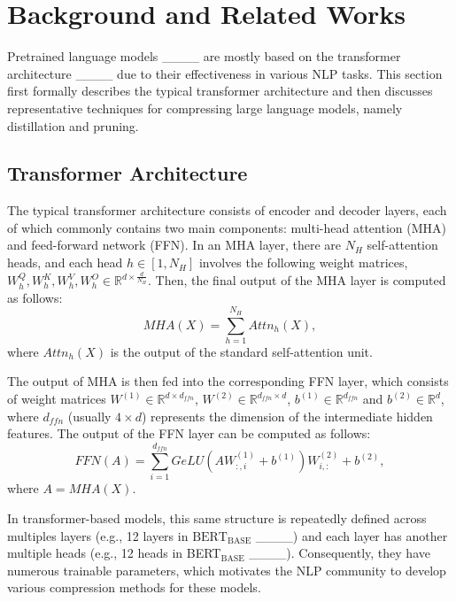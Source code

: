 \section{Background and Related Works}
\label{sec:related}
Pretrained language models ____ are mostly based on the transformer architecture ____ due to their effectiveness in various NLP tasks. This section first formally describes the typical transformer architecture and then discusses representative techniques for compressing large language models, namely distillation and pruning.


\subsection{Transformer Architecture}
The typical transformer architecture consists of encoder and decoder layers, each of which commonly contains two main components: multi-head attention (MHA) and feed-forward network (FFN). In an MHA layer, there are $N_H$ self-attention heads, and each head $h \in [1, N_H]$ involves the following weight matrices, $W_{h}^{Q}, W_{h}^{K}, W_{h}^{V}, W_{h}^{O} \in \mathbb{R}^{{d} \times\frac{d}{N_H}}$. Then, the final output of the MHA layer is computed as follows:
$$
MHA(X)= \sum_{h = 1}^{N_{H}} Attn_{h}(X),
$$
where $Attn_{h}(X)$ is the output of the standard self-attention unit.

The output of MHA is then fed into the corresponding FFN layer, which consists of weight matrices $W^{(1)}\in \mathbb{R}^{d \times d_{ffn}}$, $W^{(2)}\in \mathbb{R}^{d_{ffn} \times d}$, $b^{(1)}\in \mathbb{R}^{d_{ffn}}$ and $b^{(2)}\in \mathbb{R}^{d}$, where $d_{ffn}$ (usually $4\times d$) represents the dimension of the
intermediate hidden features. The output of the FFN layer can be computed as follows:
$$
FFN(A)=\sum_{i=1}^{d_{ffn}}GeLU(AW^{(1)}_{:,i}+b^{(1)})W^{(2)}_{i,:}+b^{(2)},
$$
where $A = MHA(X)$.

In transformer-based models, this same structure is repeatedly defined across multiples layers (e.g., 12 layers in $\text{BERT}_{\text{BASE}}$ ____) and each layer has another multiple heads (e.g., 12 heads in BERT$_{\text{BASE}}$ ____). Consequently, they have numerous trainable parameters, which motivates the NLP community to develop various compression methods for these models.


